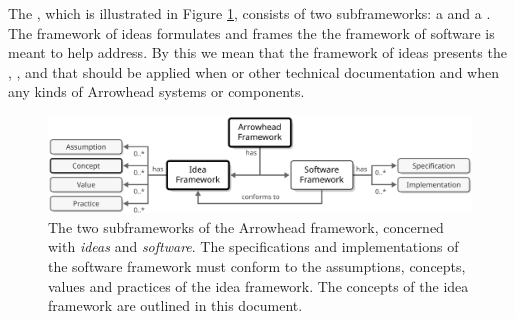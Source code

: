 %
%

The , which is illustrated in Figure \ref{fig:framework}, consists of two subframeworks: a  and a .
The framework of ideas formulates and frames the  the framework of software is meant to help address.
By this we mean that the framework of ideas presents the , ,  and  that should be applied when   or other technical documentation and when  any kinds of Arrowhead systems or components.

\begin{figure}[ht!]
  \centering
  \includegraphics[scale=0.9]{figures/framework}
  \caption{
    The two subframeworks of the Arrowhead framework, concerned with \textit{ideas} and \textit{software}.
    The specifications and implementations of the software framework must conform to the assumptions, concepts, values and practices of the idea framework.
    The concepts of the idea framework are outlined in this document.
  }
  \label{fig:framework}
\end{figure}

